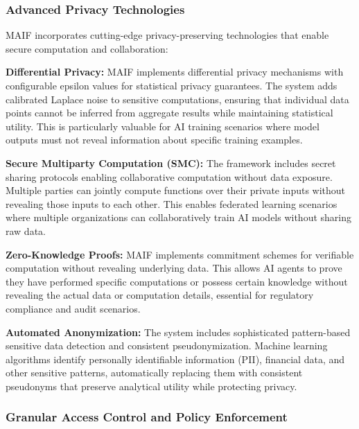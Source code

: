 \documentclass[conference]{IEEEtran}
\begin{document}
\subsubsection{Advanced Privacy Technologies}

MAIF incorporates cutting-edge privacy-preserving technologies that enable secure computation and collaboration:

\textbf{Differential Privacy:} MAIF implements differential privacy mechanisms with configurable epsilon values for statistical privacy guarantees. The system adds calibrated Laplace noise to sensitive computations, ensuring that individual data points cannot be inferred from aggregate results while maintaining statistical utility. This is particularly valuable for AI training scenarios where model outputs must not reveal information about specific training examples.

\textbf{Secure Multiparty Computation (SMC):} The framework includes secret sharing protocols enabling collaborative computation without data exposure. Multiple parties can jointly compute functions over their private inputs without revealing those inputs to each other. This enables federated learning scenarios where multiple organizations can collaboratively train AI models without sharing raw data.

\textbf{Zero-Knowledge Proofs:} MAIF implements commitment schemes for verifiable computation without revealing underlying data. This allows AI agents to prove they have performed specific computations or possess certain knowledge without revealing the actual data or computation details, essential for regulatory compliance and audit scenarios.

\textbf{Automated Anonymization:} The system includes sophisticated pattern-based sensitive data detection and consistent pseudonymization. Machine learning algorithms identify personally identifiable information (PII), financial data, and other sensitive patterns, automatically replacing them with consistent pseudonyms that preserve analytical utility while protecting privacy.

\subsubsection{Granular Access Control and Policy Enforcement}
\end{document}
